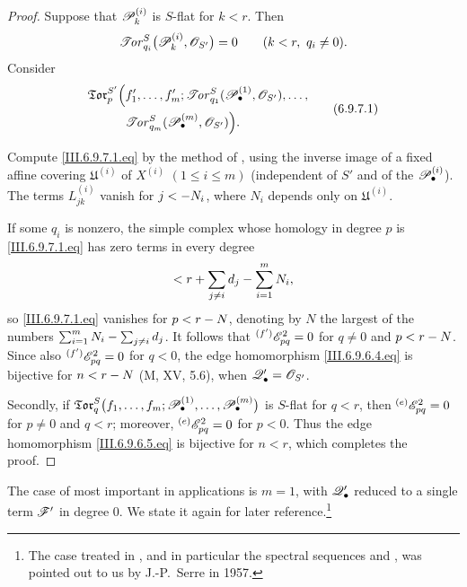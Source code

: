 \begin{proof}
Suppose that $\mathscr{P}_k^{(i)}$ is $S$-flat for $k<r$.  Then
\[
  \mathscr{T}\!\mathit{or}_{q_i}^S
  \bigl(
    \mathscr{P}_k^{(i)},\mathscr{O}_{S'}
  \bigr)
  =
  0
  \qquad
  (k<r,\ q_i\neq0).
\]
Consider
\[
\begin{split}
  \mathfrak{Tor}_p^{S'}
  \Bigl(
    &
    f_1',\ldots,f_m';
    \mathscr{T}\!\mathit{or}_{q_1}^S
    (\mathscr{P}_\bullet^{(1)},\mathscr{O}_{S'}),\ldots,
    \\
    &
    \mathscr{T}\!\mathit{or}_{q_m}^S
    (\mathscr{P}_\bullet^{(m)},\mathscr{O}_{S'})
  \Bigr).
\end{split}
  \tag{6.9.7.1}\label{III.6.9.7.1.eq}
\]


Compute \eqref{III.6.9.7.1.eq} by the method of
, using the inverse image of a fixed affine
covering $\mathfrak U^{(i)}$ of $X^{(i)}$ $(1\leq i\leq m)$ (independent of $S'$ and of the
$\mathscr{P}_\bullet^{(i)}$).  The terms $L_{jk}^{(i)}$ vanish for
$j<- N_i$, where $N_i$ depends only on $\mathfrak U^{(i)}$.

If some $q_i$ is nonzero, the simple complex whose homology in
degree $p$ is \eqref{III.6.9.7.1.eq} has zero terms in every degree
\[
  <
  r+\sum_{j\neq i}d_j-\sum_{i=1}^mN_i,
\]
so \eqref{III.6.9.7.1.eq} vanishes for $p<r- N$, denoting by $N$ the
largest of the numbers
$\sum_{i=1}^mN_i-\sum_{j\neq i}d_j$.
It follows that
${}^{(f')}\mathscr{E}_{pq}^2=0$ for $q\neq0$ and $p<r- N$.
Since also ${}^{(f')}\mathscr{E}_{pq}^2=0$ for $q<0$, the edge
homomorphism \eqref{III.6.9.6.4.eq} is bijective for $n<r- N$
(M, XV, 5.6), when $\mathscr{Q}_\bullet'=\mathscr{O}_{S'}$.

Secondly, if $\mathfrak{Tor}_q^S
\bigl(
f_1,\ldots,f_m;
\mathscr{P}_\bullet^{(1)},\ldots,\mathscr{P}_\bullet^{(m)}
\bigr)$
is $S$-flat for $q<r$, then
${}^{(e)}\mathscr{E}_{pq}^2=0$ for $p\neq0$ and $q<r$; moreover,
${}^{(e)}\mathscr{E}_{pq}^2=0$ for $p<0$.  Thus the edge homomorphism
\eqref{III.6.9.6.5.eq} is bijective for $n<r$, which completes the
proof.
\end{proof}

The case of  most important in applications is
$m=1$, with $\mathscr{Q}_\bullet'$ reduced to a single term $\mathscr{F}'$ in
degree $0$.  We state it again for later reference.\footnote{The
case treated in , and in particular the spectral
sequences  and , was pointed
out to us by J.-P.~Serre in 1957.}

